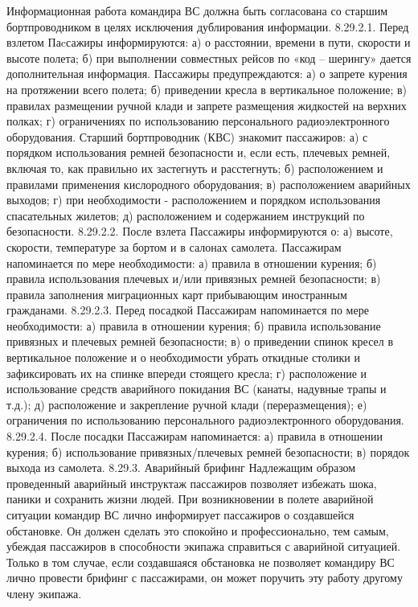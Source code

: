 Информационная работа командира ВС должна быть согласована со старшим бортпроводником в целях исключения дублирования информации.
8.29.2.1. Перед взлетом
Паcсажиры информируются:
а)	о расстоянии, времени в пути, скорости и высоте полета;
б)	при выполнении совместных рейсов по «код – шерингу» дается дополнительная информация.
Пассажиры предупреждаются:
а)	о запрете курения на протяжении всего полета;
б)	приведении кресла в вертикальное положение;
в)	правилах размещении ручной клади и запрете размещения жидкостей на верхних полках;
г)	ограничениях по использованию персонального радиоэлектронного оборудования.
Старший бортпроводник (КВС) знакомит пассажиров:
а)	с порядком использования ремней безопасности и, если есть, плечевых ремней, включая то, как правильно их застегнуть и расстегнуть;
б)	расположением и правилами применения кислородного оборудования;
в)	расположением аварийных выходов;
г)	при необходимости - расположением и порядком использования спасательных жилетов;
д)	расположением и содержанием инструкций по безопасности.
8.29.2.2. После взлета
Пассажиры информируются о:
а)	высоте, скорости, температуре за бортом и в салонах самолета.
Пассажирам напоминается по мере необходимости:
а)	правила в отношении курения;
б)	правила использования плечевых и/или привязных ремней безопасности;
в)	правила заполнения миграционных карт прибывающим иностранным гражданами.
8.29.2.3. Перед посадкой
Пассажирам напоминается по мере необходимости:
а)	правила в отношении курения;
б)	правила использование привязных и плечевых ремней безопасности;
в)	о приведении спинок кресел в вертикальное положение и о необходимости убрать откидные столики и зафиксировать их на спинке впереди стоящего кресла;
г)	расположение и использование средств аварийного покидания ВС (канаты, надувные трапы и т.д.);
д)	расположение и закрепление ручной клади (переразмещения);
е)	ограничения по использованию персонального радиоэлектронного оборудования.
8.29.2.4. После посадки
Пассажирам напоминается:
а)	правила в отношении курения;
б)	использование привязных/плечевых ремней безопасности;
в)	порядок выхода из самолета.
8.29.3.	Аварийный брифинг
Надлежащим образом проведенный аварийный инструктаж пассажиров позволяет избежать шока, паники и сохранить жизни людей. При возникновении в полете аварийной ситуации командир ВС лично информирует пассажиров о создавшейся обстановке. Он должен сделать это спокойно и профессионально, тем самым, убеждая пассажиров в способности экипажа справиться с аварийной ситуацией. Только в том случае, если создавшаяся обстановка не позволяет командиру ВС лично провести брифинг с пассажирами, он может поручить эту работу другому члену экипажа.
